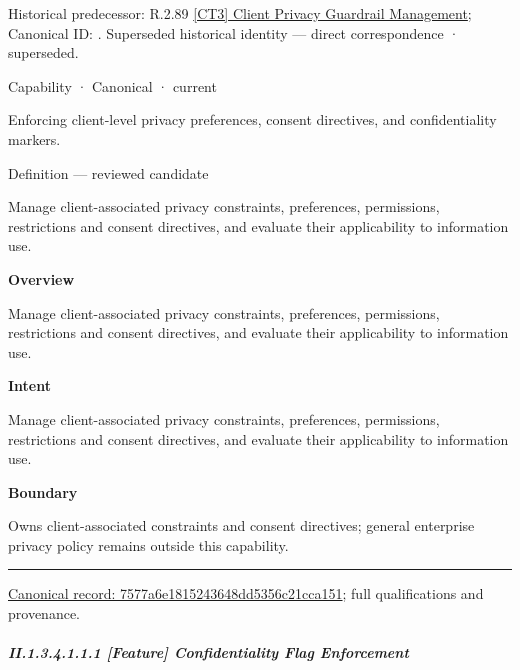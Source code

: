 {\small Historical predecessor: R.2.89 \hyperref[element:d2e6078b5db041cb904e0cadcebce6eb]{[CT3] Client Privacy Guardrail Management}; Canonical ID: \texttt{}. Superseded historical identity — direct correspondence · superseded.}\par
\label{element:7577a6e1815243648dd5356c21cca151}
{\small Capability · Canonical · current}\par

Enforcing client-level privacy preferences, consent directives, and confidentiality markers.



Definition — reviewed candidate



Manage client-associated privacy constraints, preferences, permissions, restrictions and consent directives, and evaluate their applicability to information use.



\textbf{Overview}



Manage client-associated privacy constraints, preferences, permissions, restrictions and consent directives, and evaluate their applicability to information use.



\textbf{Intent}



Manage client-associated privacy constraints, preferences, permissions, restrictions and consent directives, and evaluate their applicability to information use.



\textbf{Boundary}



Owns client-associated constraints and consent directives; general enterprise privacy policy remains outside this capability.



\medskip\hrule\medskip

{\footnotesize \href{../../../../../../../continuum/strategy/capability/7577a6e1815243648dd5356c21cca151.md}{Canonical record: 7577a6e1815243648dd5356c21cca151}; full qualifications and provenance.}\par
\subparagraph*{II.1.3.4.1.1.1 [Feature] Confidentiality Flag Enforcement}
\label{navigation:II.1.3.4.1.1.1}

